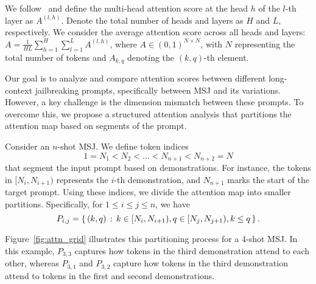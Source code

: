 We follow~\citet{zhang2023tell} and define the multi-head attention score at the head $h$ of the $l$-th layer as $A^{(l,h)}$.
Denote the total number of heads and layers as $H$ and $L$, respectively. We consider the average attention score across all heads and layers: $A = \frac{1}{HL}\sum_{h=1}^{H}\sum_{l=1}^{L}A^{(l,h)}$, where $A\in (0,1)^{N\times N}$, with $N$ representing the total number of tokens and $A_{k,q}$ denoting the $(k,q)$-th element.

Our goal is to analyze and compare attention scores between different long-context jailbreaking prompts, specifically between MSJ and its variations. However, a key challenge is the dimension mismatch between these prompts. To overcome this, we propose a structured attention analysis that partitions the attention map based on segments of the prompt. 

Consider an $n$-shot MSJ. We define token indices 
\begin{equation*}
    1=N_1 < N_2 < \dotsc < N_{n+1}<N_{n+2} = N
\end{equation*}
that segment the input prompt based on demonstrations. For instance, the tokens in $[N_i,N_{i+1})$ represents the $i$-th demonstration, and $N_{n+1}$ marks the start of the target prompt. Using these indices, we divide the attention map into smaller partitions. Specifically, for $1\leq i\leq j \leq n$, we have
\begin{equation*}
    P_{i,j} = \left\{\,(k,q)\,:\,k\in[N_i, N_{i+1}), q\in[N_j,N_{j+1}), k\leq q \,\right\}.
\end{equation*}

Figure~\ref{fig:attn_grid} illustrates this partitioning process for a 4-shot MSJ. In this example, $P_{3,3}$ captures how tokens in the third demonstration attend to each other, whereas $P_{3,1}$ and $P_{3,2}$ capture how tokens in the third demonstration attend to tokens in the first and second demonstrations.


